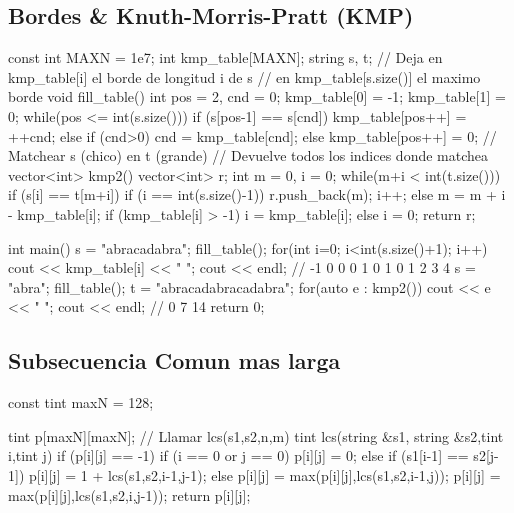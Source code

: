 \subsection{Bordes \& Knuth-Morris-Pratt (KMP)}
\begin{code}
const int MAXN = 1e7;
int kmp_table[MAXN];
string s, t;
// Deja en kmp_table[i] el borde de longitud i de s
// en kmp_table[s.size()] el maximo borde
void fill_table() {
	int pos = 2, cnd = 0;
	kmp_table[0] = -1;
	kmp_table[1] = 0;
	while(pos <= int(s.size())) {
		if (s[pos-1] == s[cnd]) 
			kmp_table[pos++] = ++cnd;
		else if (cnd>0) 
			cnd = kmp_table[cnd];
		else kmp_table[pos++] = 0;
	}
}
// Matchear s (chico) en t (grande)
// Devuelve todos los indices donde matchea
vector<int> kmp2() {
	vector<int> r;
	int m = 0, i = 0;
	while(m+i < int(t.size())) {
		if (s[i] == t[m+i]) {
			if (i == int(s.size()-1)) r.push_back(m);
			i++;
		} else {
			m = m + i - kmp_table[i];
			if (kmp_table[i] > -1) i = kmp_table[i];
			else i = 0;
		}
	}
	return r;
}

int main() {
	s = "abracadabra";
	fill_table();
	for(int i=0; i<int(s.size()+1); i++) cout << kmp_table[i] << " ";
	cout << endl; // -1 0 0 0 1 0 1 0 1 2 3 4 
	s = "abra";
	fill_table();
	t = "abracadabracadabra";
	for(auto e : kmp2()) cout << e << " ";
	cout << endl; // 0 7 14
	return 0;
}
\end{code}

\subsection{Subsecuencia Comun mas larga}
\begin{code}
const tint maxN = 128;

tint p[maxN][maxN];
// Llamar lcs(s1,s2,n,m)
tint lcs(string &s1, string &s2,tint i,tint j)
{
	if (p[i][j] == -1)
	{
		if (i == 0 or j == 0)
		p[i][j] = 0;
		else
		{
			if (s1[i-1] == s2[j-1])
			p[i][j] = 1 + lcs(s1,s2,i-1,j-1);
			else
			{
				p[i][j] = max(p[i][j],lcs(s1,s2,i-1,j));
				p[i][j] = max(p[i][j],lcs(s1,s2,i,j-1));
			}
		}
	}
	return p[i][j];
}
\end{code}

